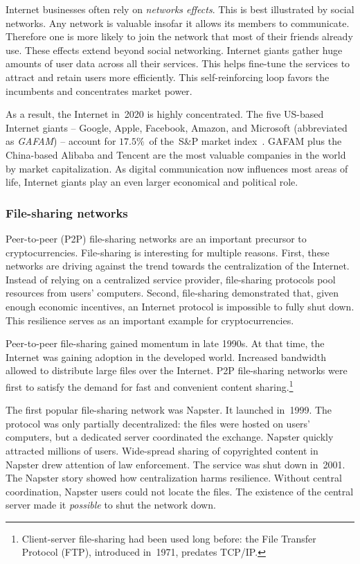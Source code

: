 Internet businesses often rely on \textit{networks effects}.
This is best illustrated by social networks.
Any network is valuable insofar it allows its members to communicate.
Therefore one is more likely to join the network that most of their friends already use.
These effects extend beyond social networking.
Internet giants gather huge amounts of user data across all their services.
This helps fine-tune the services to attract and retain users more efficiently.
This self-reinforcing loop favors the incumbents and concentrates market power.

As a result, the Internet in~2020 is highly concentrated.
The five US-based Internet giants -- Google, Apple, Facebook, Amazon, and Microsoft (abbreviated as \textit{GAFAM}) -- account for $17.5\%$~of the~S\&P market index~\cite{Levy2020}.
GAFAM plus the China-based Alibaba and Tencent are the most valuable companies in the world by market capitalization.
As digital communication now influences most areas of life, Internet giants play an even larger economical and political role.


\subsubsection*{File-sharing networks}
\label{sec:FileSharingNetworks}

Peer-to-peer (P2P) file-sharing networks are an important precursor to cryptocurrencies.
File-sharing is interesting for multiple reasons.
First, these networks are driving against the trend towards the centralization of the Internet.
Instead of relying on a centralized service provider, file-sharing protocols pool resources from users' computers.
Second, file-sharing demonstrated that, given enough economic incentives, an Internet protocol is impossible to fully shut down.
This resilience serves as an important example for cryptocurrencies.

Peer-to-peer file-sharing gained momentum in late 1990s.
At that time, the Internet was gaining adoption in the developed world.
Increased bandwidth allowed to distribute large files over the Internet.
P2P file-sharing networks were first to satisfy the demand for fast and convenient content sharing.\footnote{Client-server file-sharing had been used long before: the File Transfer Protocol (FTP), introduced in~1971,  predates TCP/IP.}

The first popular file-sharing network was Napster.
It launched in~1999.
The protocol was only partially decentralized: the files were hosted on users' computers, but a dedicated server coordinated the exchange.
Napster quickly attracted millions of users.
Wide-spread sharing of copyrighted content in Napster drew attention of law enforcement.
The service was shut down in~2001.
The Napster story showed how centralization harms resilience.
Without central coordination, Napster users could not locate the files.
The existence of the central server made it \textit{possible} to shut the network down.

